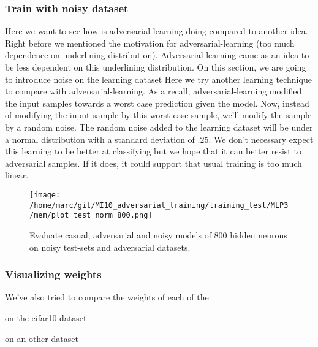 		\subsubsection{Train with noisy dataset} %
		\label{ssub:train_with_noisy_dataset}
			Here we want to see how is adversarial-learning doing compared to another idea. Right before we mentioned the motivation for adversarial-learning (too much dependence on underlining distribution). Adversarial-learning came as an idea to be less dependent on this underlining distribution. On this section, we are going to introduce noise on the learning dataset 
			Here we try another learning technique to compare with adversarial-learning. As a recall, adversarial-learning modified the input samples towards a worst case prediction given the model. Now, instead of modifying the input sample by this worst case sample, we'll modify the sample by a random noise. The random noise added to the learning dataset will be under a normal distribution with a standard deviation of $.25$. We don't necessary expect this learning to be better at classifying but we hope that it can better resist to adversarial samples. If it does, it could support that usual training is too much linear.

			\begin{figure}
				\centering
				\texttt{[image: /home/marc/git/MI10\_adversarial\_training/training\_test/MLP3/mem/plot\_test\_norm\_800.png]}
				\caption{Evaluate casual, adversarial and noisy models of 800 hidden neurons on noisy test-sets and adversarial datasets.}
				\label{fig:mnist_neurons}
			\end{figure}

			
		\subsubsection{Visualizing weights} %
		\label{ssub:visualizing_weights}
			We've also tried to compare the weights of each of the 
		

	

	on the cifar10 dataset

	on an other dataset






